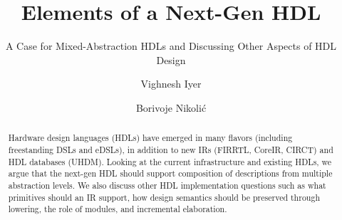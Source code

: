 \documentclass[sigplan,review,nonacm]{acmart}
\begin{document}
\title{Elements of a Next-Gen HDL}
\subtitle{A Case for Mixed-Abstraction HDLs and Discussing Other Aspects of HDL Design}


\author{Vighnesh Iyer}

\author{Borivoje Nikolić}




\begin{abstract}

Hardware design languages (HDLs) have emerged in many flavors (including freestanding DSLs and eDSLs), in addition to new IRs (FIRRTL\cite{firrtl}, CoreIR\cite{coreir}, CIRCT\cite{circt}) and HDL databases (UHDM\cite{uhdm}).
Looking at the current infrastructure and existing HDLs, we argue that the next-gen HDL should support composition of descriptions from multiple abstraction levels.
We also discuss other HDL implementation questions such as what primitives should an IR support, how design semantics should be preserved through lowering, the role of modules, and incremental elaboration.
\end{abstract}
\end{document}
